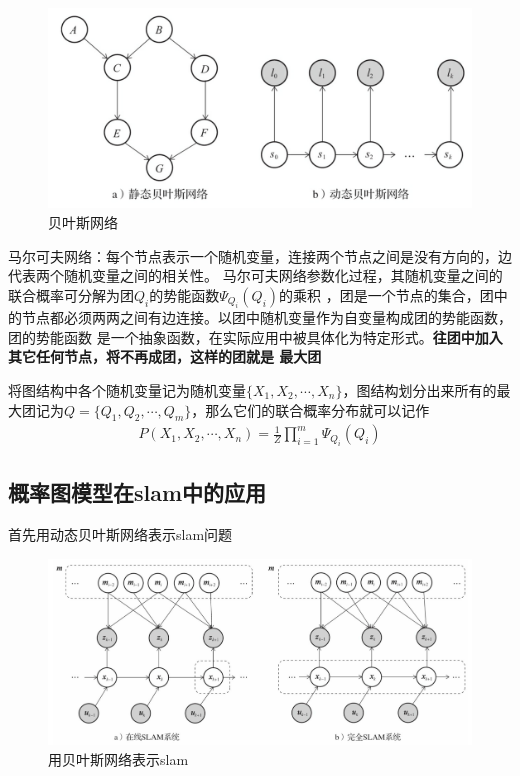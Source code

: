 \documentclass[10pt]{article}
\begin{document}
\begin{figure}[!htb]
    \includegraphics[width=\hsize]{images/贝叶斯网路.png}
    \caption{贝叶斯网络}
\end{figure}

马尔可夫网络：每个节点表示一个随机变量，连接两个节点之间是没有方向的，边代表两个随机变量之间的相关性。
马尔可夫网络参数化过程，其随机变量之间的联合概率可分解为团$Q_i$的势能函数$\varPsi_{Q_{i}}(Q_i)$的乘积
，团是一个节点的集合，团中的节点都必须两两之间有边连接。以团中随机变量作为自变量构成团的势能函数，团的势能函数
是一个抽象函数，在实际应用中被具体化为特定形式。\textbf{往团中加入其它任何节点，将不再成团，这样的团就是
最大团}

将图结构中各个随机变量记为随机变量$\{X_1,X_2,\cdots,X_n\}$，图结构划分出来所有的最大团记为$Q=\{Q_1,Q_2,
\cdots,Q_m\}$，那么它们的联合概率分布就可以记作
\begin{align} 
    P(X_1,X_2,\cdots,X_n)=\frac{1}{Z}\prod_{i=1}^{m}\Psi_{Q_i}(Q_i)
\end{align} 
\subsection{概率图模型在slam中的应用}
首先用动态贝叶斯网络表示slam问题
\begin{figure}[!htb]
    \includegraphics[width=\hsize]{images/用贝叶斯网络表示slam.png}
    \caption{用贝叶斯网络表示slam}
\end{figure}
\end{document}
